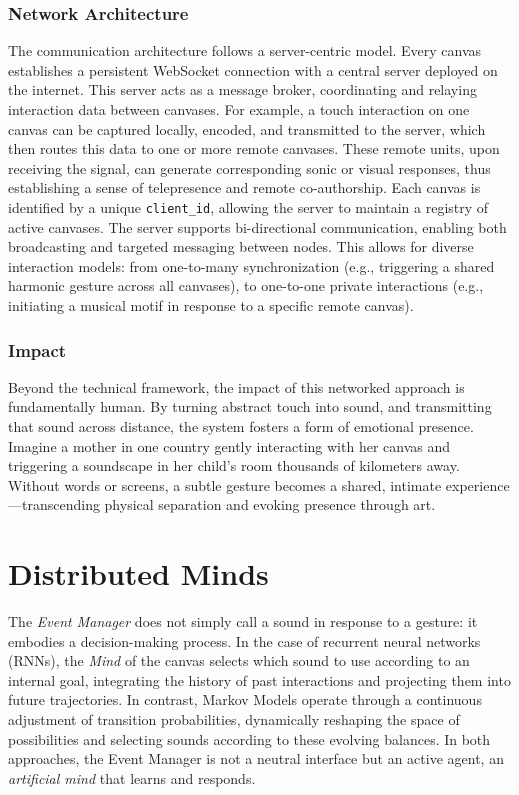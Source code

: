 \documentclass{article}
\begin{document}
\subsubsection{Network Architecture}
The communication architecture follows a server-centric model. Every canvas establishes a persistent WebSocket connection with a central server deployed on the internet. This server acts as a message broker, coordinating and relaying interaction data between canvases. For example, a touch interaction on one canvas can be captured locally, encoded, and transmitted to the server, which then routes this data to one or more remote canvases. These remote units, upon receiving the signal, can generate corresponding sonic or visual responses, thus establishing a sense of telepresence and remote co-authorship. \newline
Each canvas is identified by a unique \texttt{client\_id}, allowing the server to maintain a registry of active canvases. The server supports bi-directional communication, enabling both broadcasting and targeted messaging between nodes. This allows for diverse interaction models: from one-to-many synchronization (e.g., triggering a shared harmonic gesture across all canvases), to one-to-one private interactions (e.g., initiating a musical motif in response to a specific remote canvas).
\subsubsection{Impact}
Beyond the technical framework, the impact of this networked approach is fundamentally human. By turning abstract touch into sound, and transmitting that sound across distance, the system fosters a form of emotional presence. Imagine a mother in one country gently interacting with her canvas and triggering a soundscape in her child's room thousands of kilometers away. Without words or screens, a subtle gesture becomes a shared, intimate experience—transcending physical separation and evoking presence through art.

\section{Distributed Minds}

The \textit{Event Manager} does not simply call a sound in response to a gesture: it embodies a decision-making process. 
In the case of recurrent neural networks (RNNs), the \textit{Mind} of the canvas selects which sound to use according to an internal goal, integrating the history of past interactions and projecting them into future trajectories. 
In contrast, Markov Models operate through a continuous adjustment of transition probabilities, dynamically reshaping the space of possibilities and selecting sounds according to these evolving balances. 
In both approaches, the Event Manager is not a neutral interface but an active agent, an \textit{artificial mind} that learns and responds.
\end{document}
